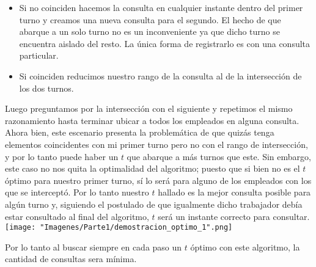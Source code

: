 \begin{itemize}
    \item Si no coinciden hacemos la consulta en cualquier instante dentro del primer turno y creamos una nueva consulta para el segundo. El hecho de que abarque a un solo turno no es un inconveniente ya que dicho turno se encuentra aislado del resto. La única forma de registrarlo es con una consulta particular.
    \item Si coinciden reducimos nuestro rango de la consulta al de la intersección de los dos turnos.
\end{itemize}
Luego preguntamos por la intersección con el siguiente y repetimos el mismo razonamiento hasta terminar ubicar a todos los empleados en alguna consulta.\newline
\newline
Ahora bien, este escenario presenta la problemática de que quizás tenga elementos coincidentes con mi primer turno pero no con el rango de intersección, y por lo tanto puede haber un $t$ que abarque a más turnos que este. Sin embargo, este caso no nos quita la optimalidad del algoritmo; puesto que si bien no es el $t$ óptimo para nuestro primer turno, sí lo será para alguno de los empleados con los que se interceptó. Por lo tanto nuestro $t$ hallado es la mejor consulta posible para algún turno y, siguiendo el postulado de que igualmente dicho trabajador debía estar consultado al final del algoritmo, $t$ será un instante correcto para consultar.\newline
\newline
\texttt{[image: "Imagenes/Parte1/demostracion\_optimo\_1".png]}\newline

Por lo tanto al buscar siempre en cada paso un $t$ óptimo con este algoritmo, la cantidad de consultas sera mínima.\newline


